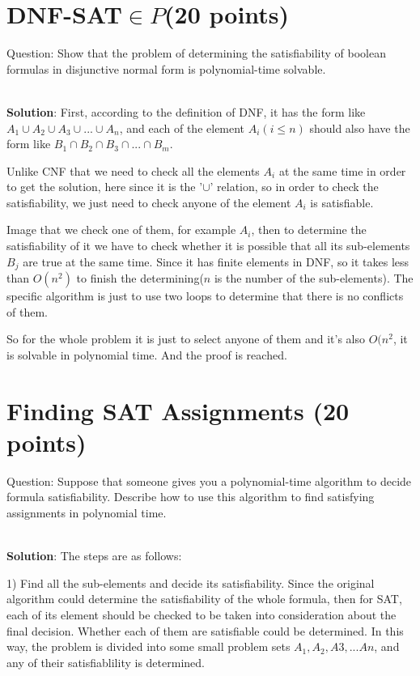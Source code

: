 \documentclass{article}
\begin{document}
\section{DNF-SAT$\in{P}$(20 points)}
Question: Show that the problem of determining the satisfiability of boolean formulas in disjunctive normal form is polynomial-time solvable.

~\\
\textbf{Solution}:\newline
\indent First, according to the definition of DNF, it has the form like $A_{1} \cup A_{2} \cup A_{3}\cup ... \cup A_{n}$, and each of the element $A_{i}(i \leq n)$ should also have the form like $B_{1} \cap B_{2} \cap B_{3} \cap ... \cap B_{m}$. 

Unlike CNF that we need to check all the elements $A_{i}$ at the same time in order to get the solution, here since it is the '$\cup$' relation, so in order to check the satisfiability, we just need to check anyone of the element $A_{i}$ is satisfiable.

Image that we check one of them, for example $A_{i}$, then to determine the satisfiability of it we have to check whether it is possible that all its sub-elements $B_{j}$ are true at the same time. Since it has finite elements in DNF, so it takes less than $O(n^{2})$ to finish the determining($n$ is the number of the sub-elements). The specific algorithm is just to use two loops to determine that there is no conflicts of them.

So for the whole problem it is just to select anyone of them and it's also $O(n^{2}$, it is solvable in polynomial time. And the proof is reached.

\section{Finding SAT Assignments (20 points)}
Question: Suppose that someone gives you a polynomial-time algorithm to decide formula satisfiability. Describe how to use this algorithm to find satisfying assignments in polynomial time.

~\\
\textbf{Solution}:\newline
\indent The steps are as follows:

1) Find all the sub-elements and decide its satisfiability. Since the original algorithm could determine the satisfiability of the whole formula, then for SAT, each of its element should be checked to be taken into consideration about the final decision. Whether each of them are satisfiable could be determined. In this way, the problem is divided into some small problem sets ${A_{1}, A_{2}, A{3}, ... A{n}}$, and any of their satisfiablility is determined.
\end{document}
